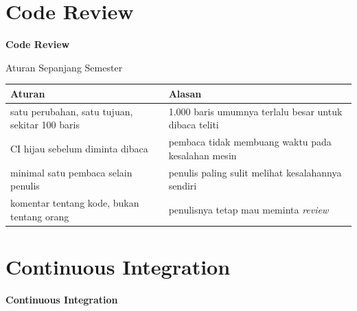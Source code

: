 \documentclass[aspectratio=169, table, 12pt]{beamer}
\begin{document}
\section{Code Review}

\begin{frame}{\hfill}
  \centering
  \Huge{\textbf{Code Review}}
\end{frame}

\begin{frame}{{\Large Aturan Sepanjang Semester}}
  \vspace{6pt}
  \centering
  {\footnotesize
  \begin{tabularx}{\textwidth}{YY}
    \hline
    \textbf{Aturan} & \textbf{Alasan} \\
    \hline
    satu perubahan, satu tujuan, sekitar 100 baris & 1.000 baris umumnya terlalu besar untuk dibaca teliti \\
    \hline
    CI hijau sebelum diminta dibaca & pembaca tidak membuang waktu pada kesalahan mesin \\
    \hline
    minimal satu pembaca selain penulis & penulis paling sulit melihat kesalahannya sendiri \\
    \hline
    komentar tentang kode, bukan tentang orang & penulisnya tetap mau meminta \textit{review} \\
    \hline
  \end{tabularx}}
\end{frame}

\section{Continuous Integration}

\begin{frame}{\hfill}
  \centering
  \Huge{\textbf{Continuous Integration}}
\end{frame}
\end{document}
